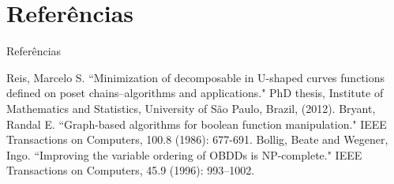 \documentclass{beamer}
\begin{document}
\section{Referências}
\begin{frame}{Referências}
\begin{thebibliography}{9} \label{sec:referencias}
Reis, Marcelo S. ``Minimization of decomposable in U-shaped curves 
functions defined on poset chains–algorithms and applications." PhD
thesis, Institute of Mathematics and Statistics, University of São 
Paulo, Brazil, (2012).
Bryant, Randal E. ``Graph-based algorithms for boolean function
manipulation." IEEE Transactions on Computers, 100.8 (1986): 677-691.
Bollig, Beate and Wegener, Ingo. ``Improving the variable ordering of
OBDDs is NP-complete." IEEE Transactions on Computers, 45.9 (1996):
993--1002.



\end{thebibliography}
\end{frame}
\end{document}
